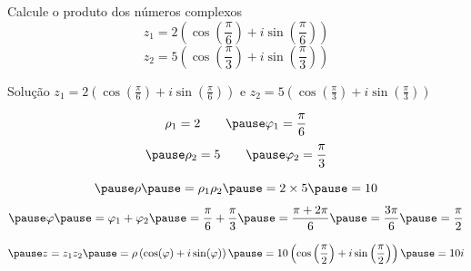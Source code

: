 \begin{question}
  Calcule o produto dos números complexos
  \[
    z_1 = 2\left(\cos\left(\frac{\pi}{6}\right) + i\sin\left(\frac{\pi}{6}\right)\right)
  \]
  \[
    z_2 = 5\left(\cos\left(\frac{\pi}{3}\right) + i\sin\left(\frac{\pi}{3}\right)\right)
  \]
\end{question}

\begin{resolution}{Solução}
  \(z_1 = 2\left(\cos\left(\frac{\pi}{6}\right) + i\sin\left(\frac{\pi}{6}\right)\right)\) e
  \(z_2 = 5\left(\cos\left(\frac{\pi}{3}\right) + i\sin\left(\frac{\pi}{3}\right)\right)\)

  \pause
  \[
    \rho_1 = 2
    \qquad
    \pause
    \varphi_1 = \frac{\pi}{6}
  \]
  \[
    \pause
    \rho_2 = 5
    \qquad
    \pause
    \varphi_2 = \frac{\pi}{3}
  \]

  \[
    \pause
    \rho
    \pause
    = \rho_1 \rho_2
    \pause
    = 2 \times 5
    \pause
    = 10
  \]
  \[
    \pause
    \varphi
    \pause
    = \varphi_1 + \varphi_2
    \pause
    = \frac{\pi}{6} + \frac{\pi}{3}
    \pause
    = \frac{\pi + 2\pi}{6}
    \pause
    = \frac{3\pi}{6}
    \pause
    = \frac{\pi}{2}
  \]

  \[
    \pause
    z = z_1 z_2
    \pause
    = \rho\left(\cos(\varphi)+i\sin(\varphi)\right)
    \pause
    = 10\left(\cos\left(\frac{\pi}{2}\right)+i\sin\left(\frac{\pi}{2}\right)\right)
    \pause
    = 10i
  \]
\end{resolution}

